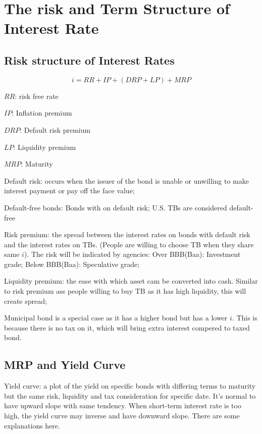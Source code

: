 \documentclass[10pt, a4paper]{article}
\begin{document}
\section{The risk and Term Structure of Interest Rate} 
\subsection{Risk structure of Interest Rates}
$$i = RR + IP + (DRP + LP) + MRP$$

\begin{center}
    $RR$: risk free rate 
    
    $IP$:  Inflation premium
    
    $DRP$: Default risk premium

    $LP$: Liquidity premium

    $MRP$: Maturity 
\end{center}

    Default risk: occurs when the issuer of the bond is unable or unwilling to make interest payment or pay off the face value; 

    Default-free bonds: Bonds with on default risk; U.S. TBs are considered default-free 

    \medskip
    
    Risk premium: the spread between the interest rates on bonds with default risk and the interest rates on TBs. (People are willing to choose TB when they share same $i$). The risk will be indicated by agencies: Over BBB(Baa): Investment grade; Below BBB(Baa): Speculative grade;   

    Liquidity premium: the ease with which asset cam be converted into cash. Similar to risk premium ass people willing to buy TB as it has high liquidity, this will create spread;
    
    Municipal bond is a special case as it has a higher bond but has a lower $i$. This is because there is no tax on it, which will bring extra interest compered to taxed bond.  
    \medskip
\subsection{MRP and Yield Curve}
    Yield curve: a plot of the yield on specific bonds with differing terms to maturity  but the same risk, liquidity  and tax consideration for specific date. It's normal to have upward slope with same tendency. When short-term interest rate is too high, the yield curve may inverse and have downward slope. There are some explanations here. 
\end{document}
